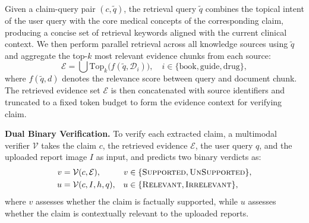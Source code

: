 \documentclass[letterpaper]{article} %
\begin{document}
Given a claim-query pair $(c, \tilde{q})$, the retrieval query $\tilde{q}$ combines the topical intent of the user query with the core medical concepts of the corresponding claim, producing a concise set of retrieval keywords aligned with the current clinical context. We then perform parallel retrieval across all knowledge sources using $\tilde{q}$ and aggregate the top-$k$ most relevant evidence chunks from each source:
\begin{equation}
\mathcal{E} = \bigcup \mathrm{Top}_k\big(f( \tilde{q}, \mathcal{D}_i)\big), \quad i \in \{\text{book}, \text{guide}, \text{drug}\},
\end{equation}
where $f(\tilde{q}, d)$ denotes the relevance score between query and document chunk. 
The retrieved evidence set $\mathcal{E}$ is then concatenated with source identifiers and truncated to a fixed token budget to form the evidence context for verifying claim. 

\vspace{2pt}
\noindent \textbf{Dual Binary Verification.}
To verify each extracted claim, a multimodal verifier $\mathcal{V}$ takes the claim $c$, the retrieved evidence $\mathcal{E}$, the user query $q$, and the uploaded report image $I$ as input, and predicts two binary verdicts as:
\begin{equation}
\begin{aligned}
v &= \mathcal{V}(c, \mathcal{E}),
& v &\in \{\textsc{Supported}, \textsc{UnSupported}\},\\
u &= \mathcal{V}(c, I, h, q),
& u &\in \{\textsc{Relevant}, \textsc{Irrelevant}\}, 
\end{aligned}
\end{equation}
where $v$ assesses whether the claim is factually supported, while $u$ assesses whether the claim is contextually relevant to the uploaded reports. 
\end{document}
